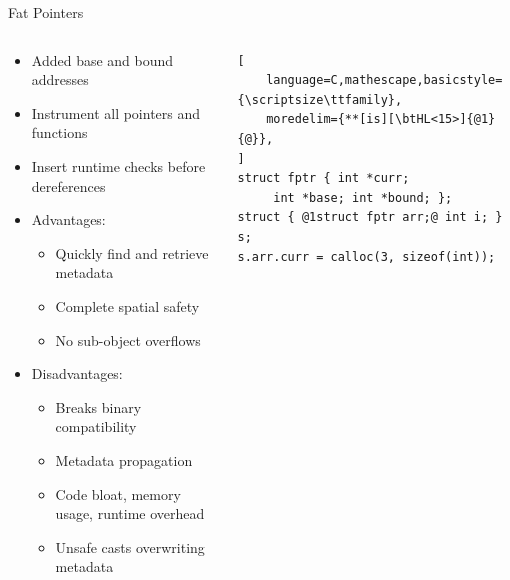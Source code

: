 \documentclass[aspectratio=169]{beamer}
\begin{document}
\begin{frame}[fragile]{Fat Pointers}
\vspace{-0.1in}
\pause
\begin{columns}[T]
\begin{column}{0.64\textwidth}
\begin{itemize}[<+->]
 \item Added base and bound addresses 
 \item Instrument all pointers and functions
 \item Insert runtime checks \alert{before dereferences} 
 \item Advantages:
     \begin{itemize}
        \item Quickly find and retrieve metadata 
        \item Complete spatial safety 
        \item No sub-object overflows 
     \end{itemize}
 \item Disadvantages:
     \begin{itemize}
        \item Breaks binary compatibility 
        \item Metadata propagation 
        \item Code bloat, memory usage, runtime overhead 
        \item Unsafe casts overwriting metadata
     \end{itemize}
\end{itemize}
\end{column}

\begin{column}{0.47\textwidth}

   \pause

\begin{lstlisting}[
    language=C,mathescape,basicstyle={\scriptsize\ttfamily},
    moredelim={**[is][\btHL<15>]{@1}{@}},
]
struct fptr { int *curr;
     int *base; int *bound; };
struct { @1struct fptr arr;@ int i; } s;
s.arr.curr = calloc(3, sizeof(int));
\end{lstlisting}


\end{column}
\end{columns}
\end{frame}
\end{document}

